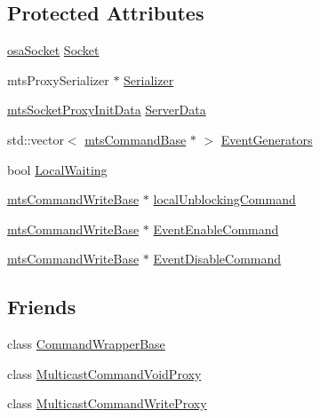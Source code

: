 \subsection*{Protected Attributes}
\begin{DoxyCompactItemize}
\item 
\hyperlink{classosa_socket}{osa\-Socket} \hyperlink{classmts_socket_proxy_client_a324fcc343989f521b7ccd1aa1fec63e9}{Socket}
\item 
mts\-Proxy\-Serializer $\ast$ \hyperlink{classmts_socket_proxy_client_a3f2c24fb49a4fe8a38418792a607cab9}{Serializer}
\item 
\hyperlink{classmts_socket_proxy_init_data}{mts\-Socket\-Proxy\-Init\-Data} \hyperlink{classmts_socket_proxy_client_aa9f989d86d2edd55f50c997b48ffcf74}{Server\-Data}
\item 
std\-::vector$<$ \hyperlink{classmts_command_base}{mts\-Command\-Base} $\ast$ $>$ \hyperlink{classmts_socket_proxy_client_a053c790025eb5df55446f6324937f666}{Event\-Generators}
\item 
bool \hyperlink{classmts_socket_proxy_client_ada937cdc99e0b2c41a569870908968b7}{Local\-Waiting}
\item 
\hyperlink{classmts_command_write_base}{mts\-Command\-Write\-Base} $\ast$ \hyperlink{classmts_socket_proxy_client_a76643549d71e37590b01cab99a19abd2}{local\-Unblocking\-Command}
\item 
\hyperlink{classmts_command_write_base}{mts\-Command\-Write\-Base} $\ast$ \hyperlink{classmts_socket_proxy_client_aa0dc648460a31f901cf8e15b9255c020}{Event\-Enable\-Command}
\item 
\hyperlink{classmts_command_write_base}{mts\-Command\-Write\-Base} $\ast$ \hyperlink{classmts_socket_proxy_client_abf972df3e4ff7d518b4e3ba06503eaba}{Event\-Disable\-Command}
\end{DoxyCompactItemize}
\subsection*{Friends}
\begin{DoxyCompactItemize}
\item 
class \hyperlink{classmts_socket_proxy_client_a1524e007c9e3f37600c0be69f3522b5d}{Command\-Wrapper\-Base}
\item 
class \hyperlink{classmts_socket_proxy_client_a2b26f00ceb33bda446951321904391d1}{Multicast\-Command\-Void\-Proxy}
\item 
class \hyperlink{classmts_socket_proxy_client_a6bc045de34366b8f0b6b2ebb3be2e9df}{Multicast\-Command\-Write\-Proxy}
\end{DoxyCompactItemize}

